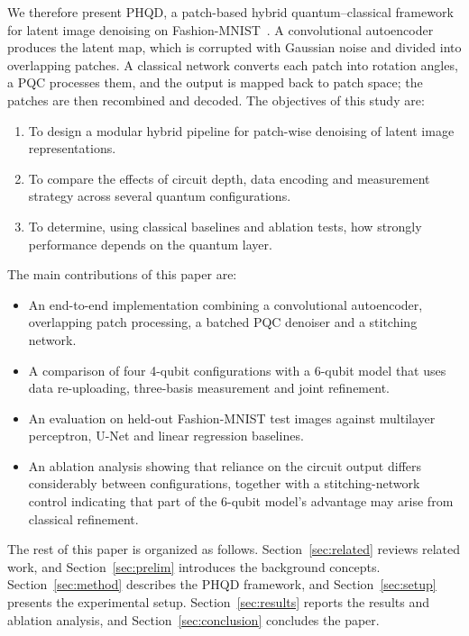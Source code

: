 We therefore present PHQD, a patch-based hybrid quantum--classical framework for latent image denoising on Fashion-MNIST~\cite{fmnist}. A convolutional autoencoder produces the latent map, which is corrupted with Gaussian noise and divided into overlapping patches. A classical network converts each patch into rotation angles, a PQC processes them, and the output is mapped back to patch space; the patches are then recombined and decoded. The objectives of this study are:
\begin{enumerate}
\item To design a modular hybrid pipeline for patch-wise denoising of latent image representations.
\item To compare the effects of circuit depth, data encoding and measurement strategy across several quantum configurations.
\item To determine, using classical baselines and ablation tests, how strongly performance depends on the quantum layer.
\end{enumerate}

The main contributions of this paper are:
\begin{itemize}
\item An end-to-end implementation combining a convolutional autoencoder, overlapping patch processing, a batched PQC denoiser and a stitching network.
\item A comparison of four 4-qubit configurations with a 6-qubit model that uses data re-uploading, three-basis measurement and joint refinement.
\item An evaluation on held-out Fashion-MNIST test images against multilayer perceptron, U-Net and linear regression baselines.
\item An ablation analysis showing that reliance on the circuit output differs considerably between configurations, together with a stitching-network control indicating that part of the 6-qubit model's advantage may arise from classical refinement.
\end{itemize}

The rest of this paper is organized as follows. Section~\ref{sec:related} reviews related work, and Section~\ref{sec:prelim} introduces the background concepts. Section~\ref{sec:method} describes the PHQD framework, and Section~\ref{sec:setup} presents the experimental setup. Section~\ref{sec:results} reports the results and ablation analysis, and Section~\ref{sec:conclusion} concludes the paper.
